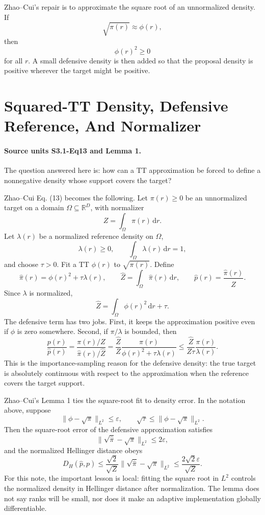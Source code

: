 \documentclass[11pt]{article}
\newcommand{\R}{\mathbb R}
\newcommand{\dd}{\,\mathrm d}
\begin{document}
Zhao--Cui's repair is to approximate the square root of an unnormalized density.
If
\[
    \sqrt{\pi(r)}\approx \phi(r),
\]
then
\[
    \phi(r)^2\ge 0
\]
for all \(r\).  A small defensive density is then added so that the proposal
density is positive wherever the target might be positive.

\section{Squared-TT Density, Defensive Reference, And Normalizer}

\paragraph{Source units S3.1-Eq13 and Lemma 1.}
The question answered here is: how can a TT approximation be forced to define a
nonnegative density whose support covers the target?

Zhao--Cui Eq. (13) becomes the following.  Let \(\pi(r)\ge0\) be an
unnormalized target on a domain \(\Omega\subseteq\R^D\), with normalizer
\[
    Z=\int_\Omega \pi(r)\dd r.
\]
Let \(\lambda(r)\) be a normalized reference density on \(\Omega\),
\[
    \lambda(r)\ge0,\qquad \int_\Omega \lambda(r)\dd r=1,
\]
and choose \(\tau>0\).  Fit a TT \(\phi(r)\) to \(\sqrt{\pi(r)}\).  Define
\[
    \widehat\pi(r)
    =
    \phi(r)^2+\tau\lambda(r),
    \qquad
    \widehat Z
    =
    \int_\Omega \widehat\pi(r)\dd r,
    \qquad
    \widehat p(r)
    =
    \frac{\widehat\pi(r)}{\widehat Z}.
    \tag{S1}
\]
Since \(\lambda\) is normalized,
\[
    \widehat Z
    =
    \int_\Omega \phi(r)^2\dd r+\tau.
    \tag{S2}
\]
The defensive term has two jobs.  First, it keeps the approximation positive
even if \(\phi\) is zero somewhere.  Second, if \(\pi/\lambda\) is bounded, then
\[
    \frac{p(r)}{\widehat p(r)}
    =
    \frac{\pi(r)/Z}{\widehat\pi(r)/\widehat Z}
    =
    \frac{\widehat Z}{Z}
    \frac{\pi(r)}{\phi(r)^2+\tau\lambda(r)}
    \le
    \frac{\widehat Z}{Z\tau}
    \frac{\pi(r)}{\lambda(r)}.
    \tag{S3}
\]
This is the importance-sampling reason for the defensive density: the true
target is absolutely continuous with respect to the approximation when the
reference covers the target support.

Zhao--Cui's Lemma 1 ties the square-root fit to density error.  In the notation
above, suppose
\[
    \|\phi-\sqrt{\pi}\|_{L^2}\le \varepsilon,
    \qquad
    \sqrt{\tau}\le \|\phi-\sqrt{\pi}\|_{L^2}.
    \tag{S4}
\]
Then the square-root error of the defensive approximation satisfies
\[
    \|\sqrt{\widehat\pi}-\sqrt{\pi}\|_{L^2}\le 2\varepsilon,
    \tag{S5}
\]
and the normalized Hellinger distance obeys
\[
    D_H(\widehat p,p)
    \le
    \frac{\sqrt{2}}{\sqrt Z}
    \|\sqrt{\widehat\pi}-\sqrt{\pi}\|_{L^2}
    \le
    \frac{2\sqrt{2}\varepsilon}{\sqrt Z}.
    \tag{S6}
\]
For this note, the important lesson is local: fitting the square root in
\(L^2\) controls the normalized density in Hellinger distance after
normalization.  The lemma does not say ranks will be small, nor does it make an
adaptive implementation globally differentiable.
\end{document}

